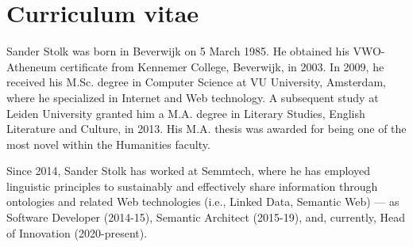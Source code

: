 
\section*{Curriculum vitae}

Sander Stolk was born in Beverwijk on 5 March 1985. He obtained his VWO-Atheneum certificate from Kennemer College, Beverwijk, in 2003. In 2009, he received his M.Sc. degree in Computer Science at VU University, Amsterdam, where he specialized in Internet and Web technology. A subsequent study at Leiden University granted him a M.A. degree in Literary Studies, English Literature and Culture, in 2013. %
His M.A. thesis was awarded for being one of the most novel within the Humanities faculty. 

Since 2014, Sander Stolk has worked at Semmtech, where he has employed linguistic principles to sustainably and effectively share information through ontologies and related Web technologies (i.e., Linked Data, Semantic Web) --- as Software Developer (2014-15), Semantic Architect (2015-19), and, currently, Head of Innovation (2020-present). 

